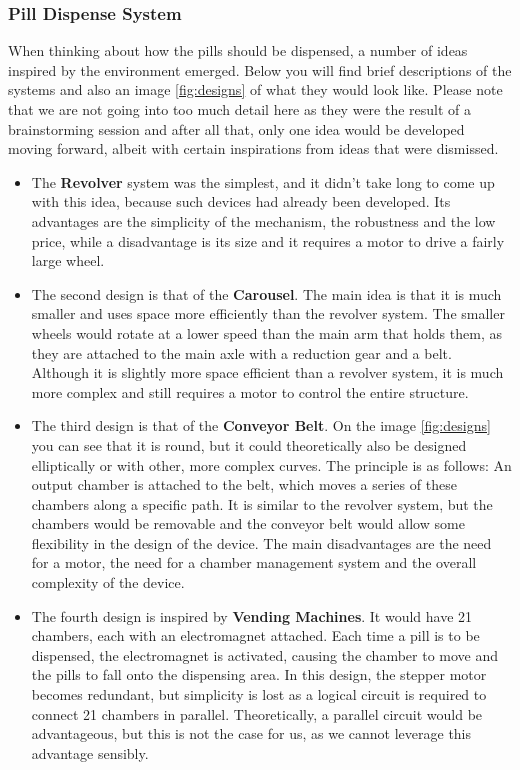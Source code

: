 \subsubsection{Pill Dispense System}
When thinking about how the pills should be dispensed, a number of ideas inspired by the environment emerged. Below you will find brief descriptions of the systems and also an image \ref{fig:designs} of what they would look like. Please note that we are not going into too much detail here as they were the result of a brainstorming session and after all that, only one idea would be developed moving forward, albeit with certain inspirations from ideas that were dismissed.
\begin{itemize}
	\item The \textbf{Revolver} system was the simplest, and it didn't take long to come up with this idea, because such devices had already been developed\cite{LiveFinePillDispenser}. Its advantages are the simplicity of the mechanism, the robustness and the low price, while a disadvantage is its size and it requires a motor to drive a fairly large wheel.
	\item The second design is that of the \textbf{Carousel}. The main idea is that it is much smaller and uses space more efficiently than the revolver system. The smaller wheels would rotate at a lower speed than the main arm that holds them, as they are attached to the main axle with a reduction gear and a belt. Although it is slightly more space efficient than a revolver system, it is much more complex and still requires a motor to control the entire structure.
	\item The third design is that of the \textbf{Conveyor Belt}. On the image \ref{fig:designs} you can see that it is round, but it could theoretically also be designed elliptically or with other, more complex curves. The principle is as follows: An output chamber is attached to the belt, which moves a series of these chambers along a specific path. It is similar to the revolver system, but the chambers would be removable and the conveyor belt would allow some flexibility in the design of the device. The main disadvantages are the need for a motor, the need for a chamber management system and the overall complexity of the device.
	\item The fourth design is inspired by \textbf{Vending Machines}. It would have 21 chambers, each with an electromagnet attached. Each time a pill is to be dispensed, the electromagnet is activated, causing the chamber to move and the pills to fall onto the dispensing area. In this design, the stepper motor becomes redundant, but simplicity is lost as a logical circuit is required to connect 21 chambers in parallel. Theoretically, a parallel circuit would be advantageous, but this is not the case for us, as we cannot leverage this advantage sensibly.
\end{itemize}
